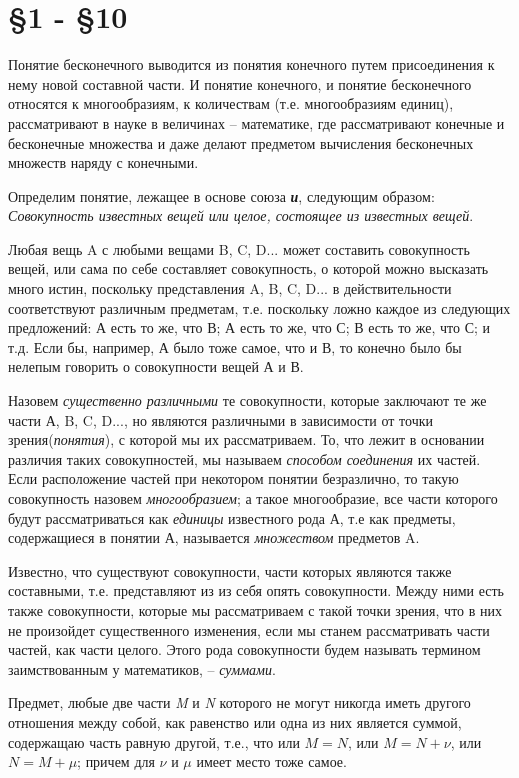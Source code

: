 \documentclass[12pt]{extarticle}
\begin{document}
\newpage
\section{\S 1 - \S 10}
Понятие бесконечного выводится из понятия конечного путем присоединения к нему новой составной части. И понятие конечного, и понятие бесконечного относятся к многообразиям, к количествам (т.е. многообразиям единиц), рассматривают в науке в величинах -- математике, где рассматривают конечные и бесконечные множества и даже делают предметом вычисления бесконечных множеств наряду с конечными. 

Определим понятие, лежащее в основе союза \textit{\bf и}, следующим образом: \textit{Совокупность известных вещей или целое, состоящее из известных вещей}.

Любая вещь A с любыми вещами B, C, D... может составить совокупность вещей, или сама по себе составляет совокупность, о которой можно высказать
много истин, поскольку представления A, B, C, D... в действительности соответствуют различным предметам, т.е. поскольку ложно каждое из
следующих предложений: А есть то же, что В; А есть то же, что С; В есть то же, что С; и т.д. Если бы, например, А было тоже самое, что и В, то конечно было бы нелепым говорить о совокупности вещей А и В.

Назовем \textit{существенно различными} те совокупности, которые заключают те же части 
А, B, C, D..., но являются различными в зависимости от точки зрения(\textit{понятия}), с которой мы их рассматриваем. То, что лежит в основании различия таких совокупностей, мы называем \textit{способом соединения} их частей.
Если расположение частей при некотором понятии безразлично, то такую совокупность назовем \textit{многообразием}; а такое
многообразие, все части которого будут рассматриваться как
\textit{единицы} известного рода А, т.е как предметы, содержащиеся в
понятии А, называется \textit{множеством} предметов A.

Известно, что существуют совокупности, части которых являются
также составными, т.е. представляют из из себя опять совокупности.
Между ними есть также совокупности, которые мы рассматриваем с такой
точки зрения, что в них не произойдет существенного изменения, если мы
станем рассматривать части частей, как части целого. Этого рода
совокупности будем называть термином заимствованным у математиков, –
\textit{суммами}.

Предмет, любые две части \textit{M} и \textit{N} которого не могут никогда иметь другого отношения между собой, как равенство или одна из них является суммой,  содержащаю часть равную другой, т.е., что или $M = N$, или $M = N + \nu$, или $N = M + \mu$; причем для $\nu$ и $\mu$ имеет место тоже самое.
\end{document}

